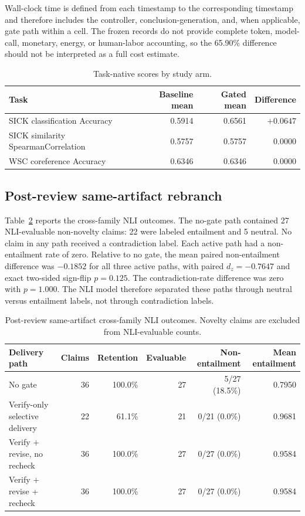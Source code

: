 \documentclass[11pt]{article}
\begin{document}
Wall-clock time is defined from each  timestamp to the corresponding  timestamp and therefore includes the controller, conclusion-generation, and, when applicable, gate path within a cell. The frozen records do not provide complete token, model-call, monetary, energy, or human-labor accounting, so the 65.90\% difference should not be interpreted as a full cost estimate.

\begin{table}[H]
\centering
\caption{Task-native scores by study arm.}
\label{tab:scores}
\begin{tabularx}{\textwidth}{>{\raggedright\arraybackslash}X r r r}
\toprule
Task & Baseline mean & Gated mean & Difference \\
\midrule
SICK classification Accuracy & 0.5914 & 0.6561 & $+0.0647$ \\
SICK similarity SpearmanCorrelation & 0.5757 & 0.5757 & 0.0000 \\
WSC coreference Accuracy & 0.6346 & 0.6346 & 0.0000 \\
\bottomrule
\end{tabularx}
\end{table}

\subsection{Post-review same-artifact rebranch}

Table~\ref{tab:rebranch} reports the cross-family NLI outcomes. The no-gate path contained 27 NLI-evaluable non-novelty claims: 22 were labeled entailment and 5 neutral. No claim in any path received a contradiction label. Each active path had a non-entailment rate of zero. Relative to no gate, the mean paired non-entailment difference was $-0.1852$ for all three active paths, with paired $d_z=-0.7647$ and exact two-sided sign-flip $p=0.125$. The contradiction-rate difference was zero with $p=1.000$. The NLI model therefore separated these paths through neutral versus entailment labels, not through contradiction labels.

\begin{table}[H]
\centering
\caption{Post-review same-artifact cross-family NLI outcomes. Novelty claims are excluded from NLI-evaluable counts.}
\label{tab:rebranch}
\small
\begin{tabularx}{\textwidth}{>{\raggedright\arraybackslash}X r r r r r}
\toprule
Delivery path & Claims & Retention & Evaluable & Non-entailment & Mean entailment \\
\midrule
No gate & 36 & 100.0\% & 27 & 5/27 (18.5\%) & 0.7950 \\
Verify-only selective delivery & 22 & 61.1\% & 21 & 0/21 (0.0\%) & 0.9681 \\
Verify + revise, no recheck & 36 & 100.0\% & 27 & 0/27 (0.0\%) & 0.9584 \\
Verify + revise + recheck & 36 & 100.0\% & 27 & 0/27 (0.0\%) & 0.9584 \\
\bottomrule
\end{tabularx}
\end{table}
\end{document}

